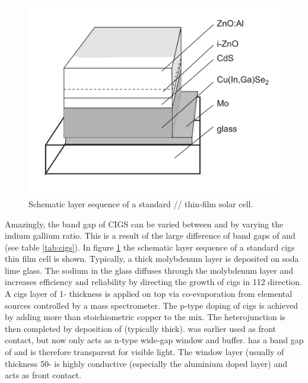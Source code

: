 \begin{figure}[tbh]
	\includegraphics[width=\textwidth]{./Pics/cigs.png}
    \caption{Schematic layer sequence of a standard // thin-film solar cell.\cite{rau2013cigs}}
	\label{fig:cigs}
\end{figure}


Amazingly, the band gap of CIGS can be varied between  and  by varying the indium gallium ratio.
This is a result of the large difference of band gaps of  and  (see table \ref{tab:cigs}). 
In figure \ref{fig:cigs} the schematic layer sequence of a standard \gls{cigs} thin film cell is shown. 
Typically, a  thick molybdenum layer is deposited on soda lime glass. 
The sodium in the glass diffuses through the molybdenum layer and increases efficiency and reliability by directing the growth of \gls{cigs} in 112 direction\cite{hedstrom1993cigs}.
A \gls{cigs} layer of 1- thickness is applied on top via co-evaporation from elemental sources controlled by a mass spectrometer\cite{hedstrom1993cigs}.
The p-type doping of \gls{cigs} is achieved by adding more than stoichiometric copper to the mix. 
The heterojunction is then completed by deposition of  (typically  thick).
 was earlier used as front contact, but now only acts as n-type wide-gap window and buffer. 
 has a band gap of  and is therefore transparent for visible light. 
The  window layer (usually of thickness 50- is highly conductive (especially the aluminium doped layer) and acts as front contact. 

